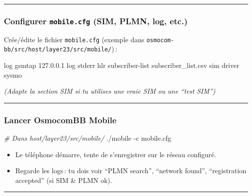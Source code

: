 \documentclass[
  french,
]{article}
\newenvironment{Shaded}{\begin{snugshade}}{\end{snugshade}}
\newcommand{\AttributeTok}[1]{\textcolor[rgb]{0.13,0.29,0.53}{#1}}
\newcommand{\CommentTok}[1]{\textcolor[rgb]{0.56,0.35,0.01}{\textit{#1}}}
\newcommand{\DataTypeTok}[1]{\textcolor[rgb]{0.13,0.29,0.53}{#1}}
\newcommand{\ExtensionTok}[1]{#1}
\newcommand{\NormalTok}[1]{#1}
\providecommand{\tightlist}{%
  \setlength{\itemsep}{0pt}\setlength{\parskip}{0pt}}
\begin{document}
\begin{center}\rule{0.5\linewidth}{0.5pt}\end{center}

\subsubsection{\texorpdfstring{Configurer \texttt{mobile.cfg} (SIM,
PLMN, log,
etc.)}{Configurer mobile.cfg (SIM, PLMN, log, etc.)}}\label{configurer-mobile.cfg-sim-plmn-log-etc.}

Crée/édite le fichier \texttt{mobile.cfg} (exemple dans
\texttt{osmocom-bb/src/host/layer23/src/mobile/})\,:

\begin{Shaded}
\begin{Highlighting}[]
\DataTypeTok{log gsmtap 127.0.0.1}
\DataTypeTok{log stderr}
\DataTypeTok{hlr}
\DataTypeTok{  subscriber{-}list subscriber\_list.csv}
\DataTypeTok{sim}
\DataTypeTok{  driver sysmo}
\end{Highlighting}
\end{Shaded}

\emph{(Adapte la section SIM si tu utilises une vraie SIM ou une ``test
SIM'')}

\begin{center}\rule{0.5\linewidth}{0.5pt}\end{center}

\subsubsection{Lancer OsmocomBB Mobile}\label{lancer-osmocombb-mobile}

\begin{Shaded}
\begin{Highlighting}[]
\CommentTok{\# Dans host/layer23/src/mobile/}
\ExtensionTok{./mobile} \AttributeTok{{-}c}\NormalTok{ mobile.cfg}
\end{Highlighting}
\end{Shaded}

\begin{itemize}
\tightlist
\item
  Le téléphone démarre, tente de s'enregistrer sur le réseau configuré.
\item
  Regarde les logs\,: tu dois voir ``PLMN search'', ``network found'',
  ``registration accepted'' (si SIM \& PLMN ok).
\end{itemize}

\begin{center}\rule{0.5\linewidth}{0.5pt}\end{center}
\end{document}

